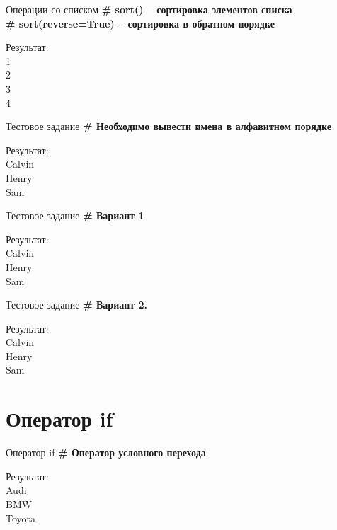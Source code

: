 \documentclass[12pt]{beamer}
\begin{document}
\begin{frame}{Операции со списком}
\textbf{\# sort() -- сортировка элементов списка} \\
\textbf{\# sort(reverse=True) -- сортировка в обратном порядке} 
\vspace{0.5cm}

\vspace{0.5cm}
Результат: \\
1 \\
2 \\
3 \\
4 \\
\end{frame}


\begin{frame}{Тестовое задание}
\textbf{\# Необходимо вывести имена в алфавитном порядке} 
\vspace{0.5cm}

\vspace{0.5cm}
Результат: \\
Calvin \\
Henry \\
Sam \\
\end{frame}


\begin{frame}{Тестовое задание}
\textbf{\# Вариант 1} 
\vspace{0.5cm}

\vspace{0.5cm}
Результат: \\
Calvin \\
Henry \\
Sam \\
\end{frame}


\begin{frame}{Тестовое задание}
\textbf{\# Вариант 2.} 
\vspace{0.5cm}

\vspace{0.5cm}
Результат: \\
Calvin \\
Henry \\
Sam \\
\end{frame}


\section{Оператор if}
\begin{frame}{Оператор if}
\textbf{\# Оператор условного перехода}
\vspace{0.5cm}

\vspace{0.5cm}
Результат: \\
Audi \\
BMW \\
Toyota \\
\end{frame}
\end{document}
